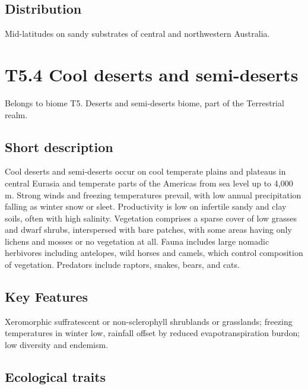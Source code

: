 \documentclass[
  letterpaper,
  DIV=11,
  numbers=noendperiod]{scrartcl}
\begin{document}
\subsection{Distribution}\label{distribution-90}

Mid-latitudes on sandy substrates of central and northwestern Australia.

\section{T5.4 Cool deserts and
semi-deserts}\label{t5.4-cool-deserts-and-semi-deserts}

Belongs to biome T5. Deserts and semi-deserts biome, part of the
Terrestrial realm.

\subsection{Short description}\label{short-description-91}

Cool deserts and semi-deserts occur on cool temperate plains and
plateaus in central Eurasia and temperate parts of the Americas from sea
level up to 4,000 m. Strong winds and freezing temperatures prevail,
with low annual precipitation falling as winter snow or sleet.
Productivity is low on infertile sandy and clay soils, often with high
salinity. Vegetation comprises a sparse cover of low grasses and dwarf
shrubs, interspersed with bare patches, with some areas having only
lichens and mosses or no vegetation at all. Fauna includes large nomadic
herbivores including antelopes, wild horses and camels, which control
composition of vegetation. Predators include raptors, snakes, bears, and
cats.

\subsection{Key Features}\label{key-features-91}

Xeromorphic suffratescent or non-sclerophyll shrublands or grasslands;
freezing temperatures in winter low, rainfall offset by reduced
evapotranspiration burdon; low diversity and endemism.

\subsection{Ecological traits}\label{ecological-traits-91}
\end{document}
